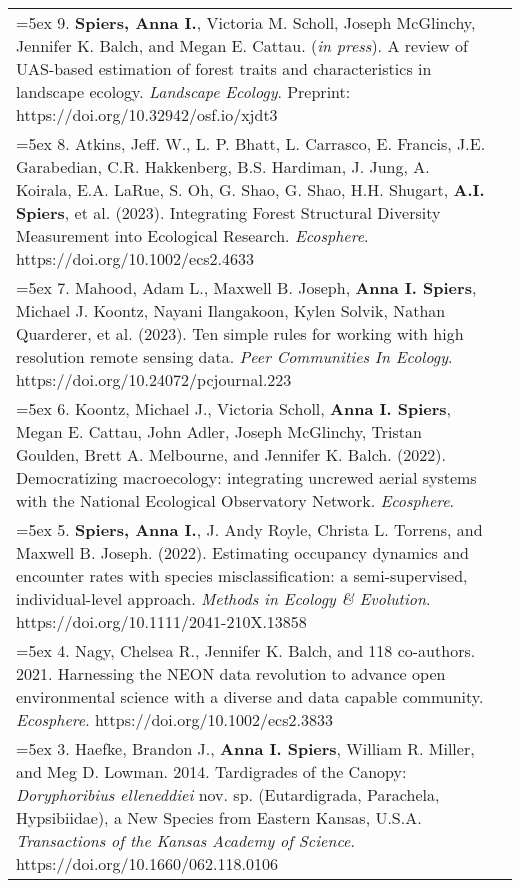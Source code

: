 \begin{longtable}{@{} >{\raggedright}p{6.10in} >{\raggedleft}X @{}}


\hangindent=5ex 9. \textbf{Spiers, Anna I.}, Victoria M. Scholl, Joseph McGlinchy, Jennifer K. Balch, and Megan E. Cattau. (\emph{in press}). A review of UAS-based estimation of forest traits and characteristics in landscape ecology. \emph{Landscape Ecology}. Preprint: https://doi.org/10.32942/osf.io/xjdt3 & \tabularnewline

\hangindent=5ex 8. Atkins, Jeff. W., L. P. Bhatt, L. Carrasco, E. Francis, J.E. Garabedian, C.R. Hakkenberg, B.S. Hardiman, J. Jung, A. Koirala, E.A. LaRue, S. Oh, G. Shao, G. Shao, H.H. Shugart, \textbf{A.I. Spiers}, et al. (2023). Integrating Forest Structural Diversity Measurement into Ecological Research. \emph{Ecosphere}. https://doi.org/10.1002/ecs2.4633 & \tabularnewline

\hangindent=5ex 7. Mahood, Adam L., Maxwell B. Joseph, \textbf{Anna I. Spiers}, Michael J. Koontz, Nayani Ilangakoon, Kylen Solvik, Nathan Quarderer, et al. (2023). Ten simple rules for working with high resolution remote sensing data. \emph{Peer Communities In Ecology}. https://doi.org/10.24072/pcjournal.223 & \tabularnewline

\hangindent=5ex 6. Koontz, Michael J., Victoria Scholl, \textbf{Anna I. Spiers}, Megan E. Cattau, John Adler, Joseph McGlinchy, Tristan Goulden, Brett A. Melbourne, and Jennifer K. Balch. (2022). Democratizing macroecology: integrating uncrewed aerial systems with the National Ecological Observatory Network. \emph{Ecosphere}.  &  \tabularnewline

\hangindent=5ex 5. \textbf{Spiers, Anna I.}, J. Andy Royle, Christa L. Torrens, and Maxwell B. Joseph. (2022). Estimating occupancy dynamics and encounter rates with species misclassification: a semi-supervised, individual-level approach. \emph{Methods in Ecology \& Evolution}. https://doi.org/10.1111/2041-210X.13858  &  \tabularnewline

\hangindent=5ex 4. Nagy, Chelsea R., Jennifer K. Balch, and 118 co-authors. 2021. Harnessing the NEON data revolution to advance open environmental science with a diverse and data capable community. \emph{Ecosphere}. https://doi.org/10.1002/ecs2.3833  &  \tabularnewline

\hangindent=5ex 3. Haefke, Brandon J., \textbf{Anna I. Spiers}, William R. Miller, and Meg D. Lowman. 2014. Tardigrades of the Canopy: \emph{Doryphoribius elleneddiei} nov. sp. (Eutardigrada, Parachela, Hypsibiidae), a New Species from Eastern Kansas, U.S.A. \emph{Transactions of the Kansas Academy of Science}. https://doi.org/10.1660/062.118.0106  &  \tabularnewline


\end{longtable}
